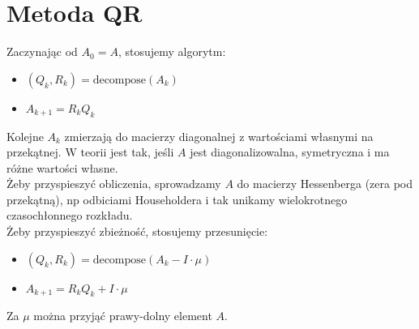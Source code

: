 \section{Metoda QR}
Zaczynając od \( A_0 = A \), stosujemy algorytm:
\begin{itemize}
\onehalfspacing
    \item \( (Q_k, R_k) = \text{decompose}(A_k) \)
    \item \( A_{k+1} = R_kQ_k \)
\end{itemize}
Kolejne \( A_k \) zmierzają do macierzy diagonalnej z wartościami własnymi na przekątnej. W teorii jest tak, jeśli \( A \) jest diagonalizowalna, symetryczna i ma różne wartości własne. \\
Żeby przyspieszyć obliczenia, sprowadzamy \( A \) do macierzy Hessenberga (zera pod przekątną), np odbiciami Householdera i tak unikamy wielokrotnego czasochłonnego rozkładu. \\
Żeby przyspieszyć zbieżność, stosujemy przesunięcie:
\begin{itemize}
\onehalfspacing
    \item \( (Q_k, R_k) = \text{decompose}(A_k - I \cdot \mu) \)
    \item \( A_{k+1} = R_kQ_k + I \cdot \mu \)
\end{itemize}
Za \( \mu \) można przyjąć prawy-dolny element \( A \).